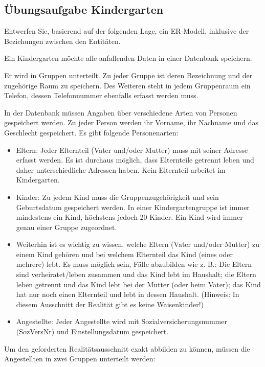       \subsection{\"Ubungsaufgabe Kindergarten}
        Entwerfen Sie, basierend auf der folgenden Lage, ein ER-Modell, inklusive der Beziehungen zwischen den Entit\"{a}ten.

        Ein Kindergarten m\"ochte alle anfallenden Daten in einer Datenbank speichern.

        Er wird in Gruppen unterteilt. Zu jeder Gruppe ist deren Bezeichnung und der zugeh\"orige Raum zu speichern. Des Weiteren steht in jedem Gruppenraum ein Telefon, dessen Telefonnummer ebenfalls erfasst werden muss.

        In der Datenbank m\"ussen Angaben \"uber verschiedene Arten von Personen gespeichert werden. Zu jeder Person werden ihr Vorname, ihr Nachname und das Geschlecht gespeichert. Es gibt folgende Personenarten:
        \begin{itemize}
          \item Eltern: Jeder Elternteil (Vater und/oder Mutter) muss mit seiner Adresse erfasst werden. Es ist durchaus m\"oglich, dass Elternteile getrennt leben und daher unterschiedliche Adressen haben. Kein Elternteil arbeitet im Kindergarten.
          \item Kinder: Zu jedem Kind muss die Gruppenzugeh\"origkeit und sein Geburtsdatum gespeichert werden. In einer Kindergartengruppe ist immer mindestens ein Kind, h\"ochstens jedoch 20 Kinder. Ein Kind wird immer genau einer Gruppe zugeordnet.
          \item Weiterhin ist es wichtig zu wissen, welche Eltern (Vater und/oder Mutter) zu einem Kind geh\"oren und bei welchem Elternteil das Kind (eines oder mehrere) lebt. Es muss m\"oglich sein, F\"alle abzubilden wie z. B.: Die Eltern sind verheiratet/leben zusammen und das Kind lebt im Haushalt; die Eltern leben getrennt und das Kind lebt bei der Mutter (oder beim Vater); das Kind hat nur noch einen Elternteil und lebt in dessen Haushalt. (Hinweis: In diesem Ausschnitt der Realit\"at gibt es keine Waisenkinder!)
          \item Angestellte: Jeder Angestellte wird mit Sozialversicherungsnummer (SozVersNr) und Einstellungsdatum gespeichert.
        \end{itemize}

        Um den geforderten Realit\"atsausschnitt exakt abbilden zu k\"onnen,
        m\"ussen die Angestellten in zwei Gruppen unterteilt werden:

